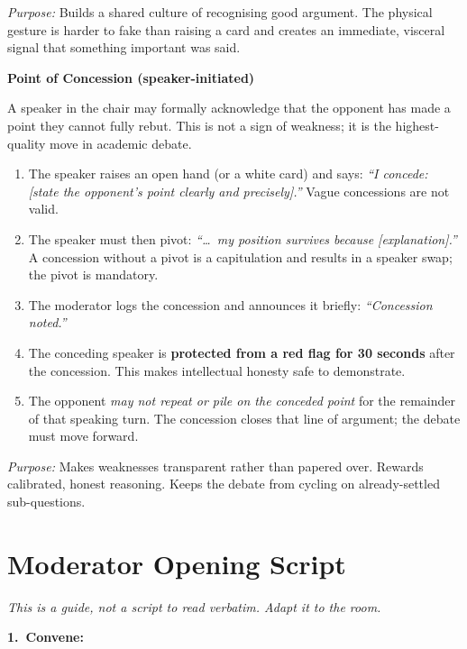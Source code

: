 \noindent\textit{Purpose:} Builds a shared culture of recognising good
argument. The physical gesture is harder to fake than raising a card and
creates an immediate, visceral signal that something important was said.

\bigskip

\noindent\textbf{Point of Concession (speaker-initiated)}

\noindent A speaker in the chair may formally acknowledge that the opponent
has made a point they cannot fully rebut. This is not a sign of weakness;
it is the highest-quality move in academic debate.

\begin{enumerate}
    \item The speaker raises an open hand (or a white card) and says:
          \textit{``I concede: [state the opponent's point clearly and
          precisely].''} Vague concessions are not valid.
    \item The speaker must then pivot: \textit{``\ldots\ my position survives
          because [explanation].''} A concession without a pivot is a
          capitulation and results in a speaker swap; the pivot is mandatory.
    \item The moderator logs the concession and announces it briefly:
          \textit{``Concession noted.''}
    \item The conceding speaker is \textbf{protected from a red flag for
          30 seconds} after the concession. This makes intellectual honesty
          safe to demonstrate.
    \item The opponent \textit{may not repeat or pile on the conceded point}
          for the remainder of that speaking turn. The concession closes
          that line of argument; the debate must move forward.
\end{enumerate}

\noindent\textit{Purpose:} Makes weaknesses transparent rather than papered
over. Rewards calibrated, honest reasoning. Keeps the debate from
cycling on already-settled sub-questions.


\section*{Moderator Opening Script}

\medskip
\noindent\textit{This is a guide, not a script to read verbatim.
Adapt it to the room.}

\medskip
\noindent \textbf{1.\ Convene:}


